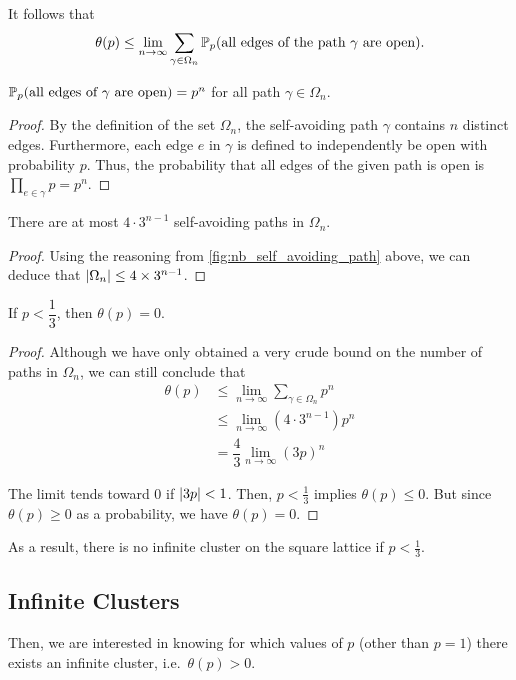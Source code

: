\documentclass[a4paper, 12pt]{article}
\begin{document}
It follows that
\[\theta(p) \leq \lim_{n \to \infty} \sum_{\gamma \in \Omega_n} \mathbb{P}_p(\text{all edges of the path } \gamma \text{ are open}).\]

\begin{prop}\label{prop:p_path_all_open}
$\mathbb{P}_p(\text{all edges of } \gamma \text{ are open}) = p^n$ for all path $\gamma \in \Omega_n$.
\end{prop}
\begin{proof}
By the definition of the set $\Omega_n$, the self-avoiding path $\gamma$ contains $n$ distinct edges. Furthermore, each edge $e$ in $\gamma$ is defined to independently be open with probability $p$. Thus, the probability that all edges of the given path is open is $\prod_{e \in \gamma} p = p^n$.
\end{proof}

\begin{prop}\label{prop:nb_paths_len_n}
There are at most $4 \cdot 3^{n - 1}$ self-avoiding paths in $\Omega_n$.
\end{prop}

\begin{proof}
Using the reasoning from \cref{fig:nb_self_avoiding_path} above, we can deduce that $\lvert \Omega_n \rvert \leq 4 \times 3^{n - 1}$.
\end{proof}

\begin{thm}\label{thm:pc_lower_bound}
If $p < \dfrac{1}{3}$, then $\theta(p) = 0$.
\end{thm}
\begin{proof}
Although we have only obtained a very crude bound on the number of paths in $\Omega_n$, we can still conclude that
\begin{align*}
    \theta(p)
    &\leq \lim_{n \to \infty} \sum_{\gamma \in \Omega_n} p^n\\
    &\leq \lim_{n \to \infty} \left(4 \cdot 3^{n - 1}\right) p^n\\
    &= \dfrac{4}{3} \lim_{n \to \infty} (3p)^n
\end{align*}

The limit tends toward 0 if $\lvert 3p \rvert < 1$. Then, $p < \frac{1}{3}$ implies $\theta(p) \leq 0$. But since $\theta(p) \geq 0$ as a probability, we have $\theta(p) = 0$.
\end{proof}

As a result, there is no infinite cluster on the square lattice if $p < \frac{1}{3}$.

\subsection{Infinite Clusters}\label{subsec:inf_cluster}
Then, we are interested in knowing for which values of $p$ (other than $p = 1$) there exists an infinite cluster, i.e.\ $\theta(p) > 0$.
\end{document}

